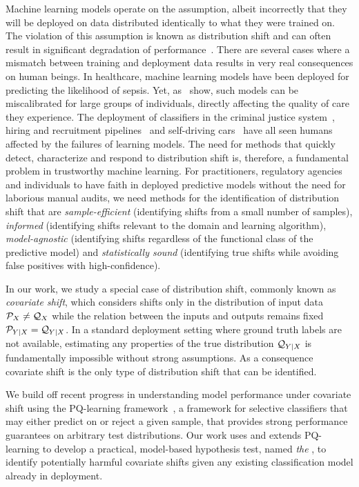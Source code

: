 Machine learning models operate on the assumption, albeit incorrectly that they will be deployed on data distributed identically to what they were trained on.
The violation of this assumption is known as distribution shift and can often result in significant degradation of performance~\citep{cifar101,cifar10C,learnundercov, failloud, mindperfgap, trustuncert}.
There are several cases where a mismatch between training and deployment data results in very real consequences on human beings.
In healthcare, machine learning models have been deployed for predicting the likelihood of sepsis.
Yet, as~\citep{10.1001/jamainternmed.2021.3333} show, such models can be miscalibrated for large groups of individuals, directly affecting the quality of care they experience.
The deployment of classifiers in the criminal justice system~\citep{AIissend45:online}, hiring and recruitment pipelines~\citep{Amazonsc17:online} and self-driving cars~\citep{selfdrive} have all seen humans affected by the failures of learning models.
The need for methods that quickly detect, characterize and respond to distribution shift is, therefore, a fundamental problem in trustworthy machine learning.
For practitioners, regulatory agencies and individuals to have faith in deployed predictive models without the need for laborious manual audits, we need methods for the identification of distribution shift
that are \textit{sample-efficient} (identifying shifts from a small number of samples), \textit{informed} (identifying shifts relevant to the domain and learning algorithm), \textit{model-agnostic}
(identifying shifts regardless of the functional class of the predictive model) and \textit{statistically sound} (identifying true shifts while avoiding false positives with high-confidence).

In our work, we study a special case of distribution shift, commonly known as \textit{covariate shift}, which considers shifts only in the distribution of input data $\mathcal{P}_X \neq \mathcal{Q}_X$ while the relation between the inputs and outputs remains fixed $\mathcal{P}_{Y|X} = \mathcal{Q}_{Y|X}$.
In a standard deployment setting where ground truth labels are not available, estimating any properties of the true distribution $\mathcal{Q}_{Y|X}$ is fundamentally impossible without strong assumptions.
As a consequence covariate shift is the only type of distribution shift that can be identified.

We build off recent progress in understanding model performance under covariate shift using the PQ-learning framework~\citep{pqlearn}, a framework for selective classifiers that may either predict on or reject a given sample, that provides strong performance guarantees on arbitrary test distributions.
Our work uses and extends PQ-learning to develop a practical, model-based hypothesis test, named \textit{the \method}, to identify potentially harmful covariate shifts given any existing classification model already in deployment.

